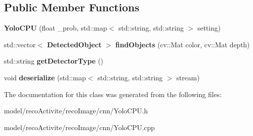 \subsection*{Public Member Functions}
\begin{DoxyCompactItemize}
\item 
\mbox{\label{class_yolo_c_p_u_af9df13a7e255a3938a75902b690c4135}} 
{\bfseries Yolo\+C\+PU} (float \+\_\+prob, std\+::map$<$ std\+::string, std\+::string $>$ setting)
\item 
\mbox{\label{class_yolo_c_p_u_a79e51bfb44edafc29942c8482d134c27}} 
std\+::vector$<$ \textbf{ Detected\+Object} $>$ {\bfseries find\+Objects} (cv\+::\+Mat color, cv\+::\+Mat depth)
\item 
\mbox{\label{class_yolo_c_p_u_a96e2dd036015132b351e0ce28376e5fe}} 
std\+::string {\bfseries get\+Detector\+Type} ()
\item 
\mbox{\label{class_yolo_c_p_u_ac448b664d5eb80a2efa34536dccec142}} 
void {\bfseries deserialize} (std\+::map$<$ std\+::string, std\+::string $>$ stream)
\end{DoxyCompactItemize}


The documentation for this class was generated from the following files\+:\begin{DoxyCompactItemize}
\item 
model/reco\+Activite/reco\+Image/cnn/Yolo\+C\+P\+U.\+h\item 
model/reco\+Activite/reco\+Image/cnn/Yolo\+C\+P\+U.\+cpp\end{DoxyCompactItemize}
